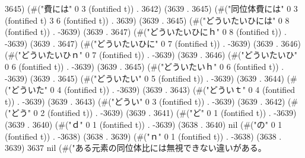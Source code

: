 3645) (#("費には" 0 3 (fontified t)) . 3642) (3639 . 3645) (#("同位体費には" 0 3 (fontified t) 3 6 (fontified t)) . 3639) (3639 . 3645) (#("どういたいひには" 0 8 (fontified t)) . -3639) (3639 . 3647) (#("どういたいひにｈ" 0 8 (fontified t)) . -3639) (3639 . 3647) (#("どういたいひに" 0 7 (fontified t)) . -3639) (3639 . 3646) (#("どういたいひｎ" 0 7 (fontified t)) . -3639) (3639 . 3646) (#("どういたいひ" 0 6 (fontified t)) . -3639) (3639 . 3645) (#("どういたいｈ" 0 6 (fontified t)) . -3639) (3639 . 3645) (#("どういたい" 0 5 (fontified t)) . -3639) (3639 . 3644) (#("どういた" 0 4 (fontified t)) . -3639) (3639 . 3643) (#("どういｔ" 0 4 (fontified t)) . -3639) (3639 . 3643) (#("どうい" 0 3 (fontified t)) . -3639) (3639 . 3642) (#("どう" 0 2 (fontified t)) . -3639) (3639 . 3641) (#("ど" 0 1 (fontified t)) . -3639) (3639 . 3640) (#("ｄ" 0 1 (fontified t)) . -3639) (3638 . 3640) nil (#("の" 0 1 (fontified t)) . -3638) (3638 . 3639) (#("ｎ" 0 1 (fontified t)) . -3638) (3638 . 3639) 3637 nil (#("ある元素の同位体比には無視できない違いがある。

